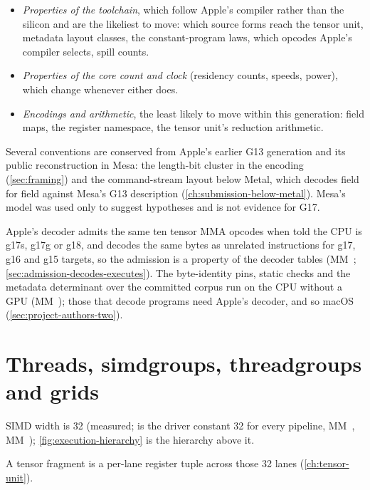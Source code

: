 \begin{itemize}
\item \emph{Properties of the toolchain}, which follow Apple's compiler rather than the silicon and are the likeliest to move:
  which source forms reach the tensor unit, metadata layout classes, the constant-program laws, which opcodes Apple's
  compiler selects, spill counts.
\item \emph{Properties of the core count and clock} (residency counts, speeds, power), which change whenever either
  does.
\item \emph{Encodings and arithmetic}, the least likely to move within this generation: field maps, the register namespace,
  the tensor unit's reduction arithmetic.
\end{itemize}

Several conventions are conserved from Apple's earlier G13 generation and its public reconstruction in Mesa: the
length-bit cluster in the encoding (\cref{sec:framing}) and the command-stream layout below Metal, which decodes field for
field against Mesa's G13 description (\cref{ch:submission-below-metal}). Mesa's model was used only to suggest hypotheses and is not evidence for G17.

Apple's decoder admits the same ten tensor MMA opcodes when told the CPU is g17s, g17g or g18, and decodes the same
bytes as unrelated instructions for g17, g16 and g15 targets, so the admission is a property of the decoder tables
(MM~; \cref{sec:admission-decodes-executes}). The byte-identity pins, static checks and the metadata determinant over
the committed corpus run on the CPU without a GPU (MM~); those that decode programs need Apple's decoder, and
so macOS (\cref{sec:project-authors-two}).

\section{Threads, simdgroups, threadgroups and grids}\label{sec:threads-simdgroups-threadgroups}

SIMD width is 32 (measured;  is the driver constant 32 for every pipeline, MM~,
MM~); \cref{fig:execution-hierarchy} is the hierarchy above it.


 A tensor fragment is a per-lane register tuple across those 32 lanes (\cref{ch:tensor-unit}).

